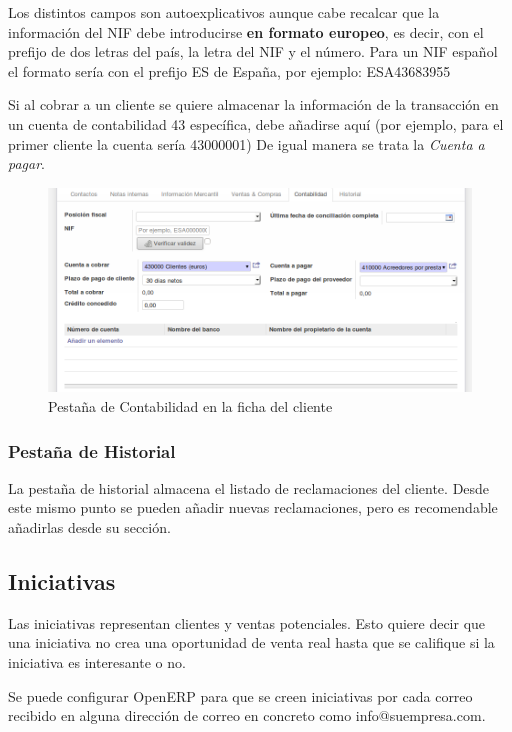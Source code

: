Los distintos campos son autoexplicativos aunque cabe recalcar que la información del NIF debe introducirse
\textbf{en formato europeo}, es decir, con el prefijo de dos letras del país, la letra del NIF y el número. Para un NIF
español el formato sería con el prefijo ES de España, por ejemplo: ESA43683955 

Si al cobrar a un cliente se quiere almacenar la información de la transacción en un cuenta de contabilidad
43 específica, debe añadirse aquí (por ejemplo, para el primer cliente la cuenta sería 43000001)
De igual manera se trata la \emph{Cuenta a pagar}.

\begin{figure}[H]
\includegraphics[width=\textwidth]{ventas/img/ven_clicontablidad.png}
\caption{Pestaña de Contabilidad en la ficha del cliente}
\label{ven:clicontabilidad}
\end{figure}



\subsubsection{Pestaña de Historial} 
La pestaña de historial almacena el listado de reclamaciones del cliente. Desde este
mismo punto se pueden añadir nuevas reclamaciones, pero es recomendable añadirlas desde su
sección.


\subsection{Iniciativas}
\label{iniciativas}
Las iniciativas representan clientes y ventas potenciales. Esto quiere decir que una iniciativa no crea una oportunidad de venta real
hasta que se califique si la iniciativa es interesante o no.

Se puede configurar OpenERP para que se creen iniciativas por cada correo recibido en alguna dirección de correo en concreto como info@suempresa.com.


